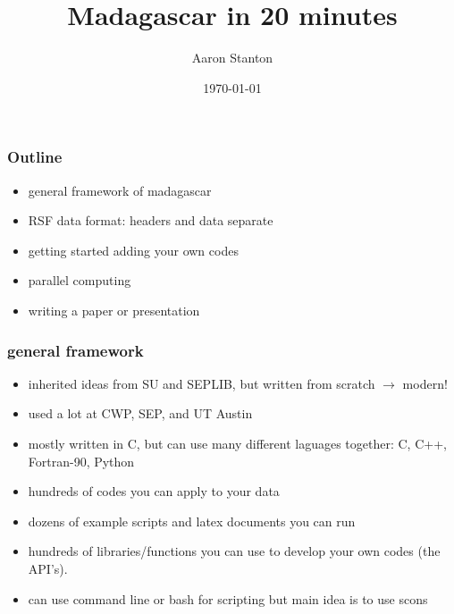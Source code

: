 \title[Short title]{Madagascar in 20 minutes}
\author{Aaron Stanton}
\date{\today}


\maketitle

\begin{frame} \frametitle{Outline}
    \begin{itemize}
        \item general framework of madagascar
        \item RSF data format: headers and data separate
        \item getting started adding your own codes
        \item parallel computing
        \item writing a paper or presentation
    \end{itemize}
\end{frame}

\begin{frame} \frametitle{general framework}
    \begin{itemize}
        \item inherited ideas from SU and SEPLIB, but written from scratch $\rightarrow$ modern!
        \item used a lot at CWP, SEP, and UT Austin
        \item mostly written in C, but can use many different laguages together: C, C++, Fortran-90, Python
        \item hundreds of codes you can apply to your data
        \item dozens of example scripts and latex documents you can run
        \item hundreds of libraries/functions you can use to develop your own codes (the API's).
        \item can use command line or bash for scripting but main idea is to use scons 
    \end{itemize}
\end{frame}

